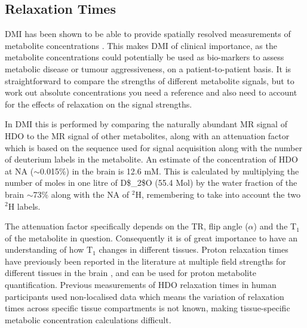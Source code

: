 \subsection{Relaxation Times}

\Ac{DMI} has been shown to be able to provide spatially resolved measurements of metabolite concentrations \cite{Kreis2020MeasuringMRI,Lu2017QuantitativeSpectroscopy}. This makes \ac{DMI} of clinical importance, as the metabolite concentrations could potentially be used as bio-markers to assess metabolic disease or tumour aggressiveness, on a patient-to-patient basis. It is straightforward to compare the strengths of different metabolite signals, but to work out absolute concentrations you need a reference and also need to account for the effects of relaxation on the signal strengths. 

In \ac{DMI} this is performed by comparing the naturally abundant MR signal of \ac{HDO} to the MR signal of other metabolites, along with an attenuation factor which is based on the sequence used for signal acquisition along with the number of deuterium labels in the metabolite. An estimate of the concentration of \ac{HDO} at \ac{NA} ($\sim$0.015\%) in the brain is 12.6 mM. This is calculated by multiplying the number of moles in one litre of \ac{D$_2$O} (55.4 Mol) by the water fraction of the brain $\sim$73\% along with the \ac{NA} of $^2$H, remembering to take into account the two $^2$H labels.

The attenuation factor specifically depends on the \ac{TR}, flip angle ($\alpha$) and the T$_1$ of the metabolite in question. Consequently it is of great importance to have an understanding of how T$_1$ changes in different tissues. Proton relaxation times have previously been reported in the literature at multiple field strengths for different tissues in the brain \cite{Wright2008WaterOptimization}, and can be used for proton metabolite quantification. Previous measurements of \ac{HDO} relaxation times in human participants used non-localised data \cite{DeFeyter2018DeuteriumVivo, Ruhm2022Dynamic9.4T, Gursan2022ResidualMuscle} which means the variation of relaxation times across specific tissue compartments is not known, making tissue-specific metabolic concentration calculations difficult.  

